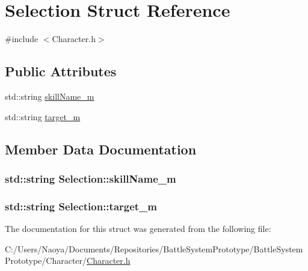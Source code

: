 \hypertarget{struct_selection}{}\section{Selection Struct Reference}
\label{struct_selection}


{\ttfamily \#include $<$Character.\+h$>$}

\subsection*{Public Attributes}
\begin{DoxyCompactItemize}
\item 
std\+::string \hyperlink{struct_selection_a8634426d66a52087240cffd66104d8b8}{skill\+Name\+\_\+m}
\item 
std\+::string \hyperlink{struct_selection_a1b21fefdc3fa3795f1c0a4701e9f8ee9}{target\+\_\+m}
\end{DoxyCompactItemize}


\subsection{Member Data Documentation}
\hypertarget{struct_selection_a8634426d66a52087240cffd66104d8b8}{}
\subsubsection[{skill\+Name\+\_\+m}]{\setlength{\rightskip}{0pt plus 5cm}std\+::string Selection\+::skill\+Name\+\_\+m}\label{struct_selection_a8634426d66a52087240cffd66104d8b8}
\hypertarget{struct_selection_a1b21fefdc3fa3795f1c0a4701e9f8ee9}{}
\subsubsection[{target\+\_\+m}]{\setlength{\rightskip}{0pt plus 5cm}std\+::string Selection\+::target\+\_\+m}\label{struct_selection_a1b21fefdc3fa3795f1c0a4701e9f8ee9}


The documentation for this struct was generated from the following file\+:\begin{DoxyCompactItemize}
\item 
C\+:/\+Users/\+Naoya/\+Documents/\+Repositories/\+Battle\+System\+Prototype/\+Battle\+System\+Prototype/\+Character/\hyperlink{_character_8h}{Character.\+h}\end{DoxyCompactItemize}
